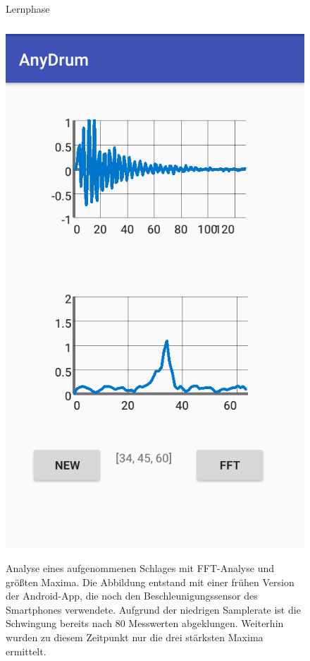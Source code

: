 \begin{figure}[H]Lernphase
	\centering
	\includegraphics[scale=0.4]{figures/gui_FFT.png}
	\caption{Analyse eines aufgenommenen Schlages mit FFT-Analyse und größten Maxima. Die Abbildung entstand mit einer frühen Version der Android-App, die noch den Beschleunigungssensor des Smartphones verwendete. Aufgrund der niedrigen Samplerate ist die Schwingung bereits nach 80 Messwerten abgeklungen. Weiterhin wurden zu diesem Zeitpunkt nur die drei stärksten Maxima ermittelt.}
	\label{fig:guiA}
\end{figure}


